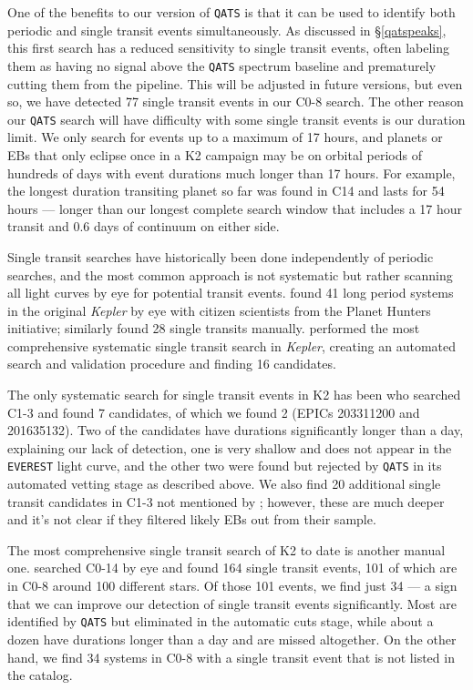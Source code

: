 \documentclass[twocolumn]{aastex62}
\newcommand{\project}[1]{\textsl{#1}}
\newcommand{\pipeline}[1]{\texttt{#1}}
\newcommand{\nsingletran}{77}
\begin{document}
One of the benefits to our version of \pipeline{QATS} is that it can
be used to identify both periodic and single transit events
simultaneously. As discussed in \S\ref{qatspeaks}, this first search
has a reduced sensitivity to single transit events, often labeling
them as having no signal above the \pipeline{QATS} spectrum baseline
and prematurely cutting them from the pipeline. This will be adjusted
in future versions, but even so, we have detected \nsingletran{}
single transit events in our C0-8 search. The other reason our
\pipeline{QATS} search will have difficulty with some single transit
events is our duration limit. We only search for events up to a
maximum of 17 hours, and planets or EBs that only eclipse once in a K2
campaign may be on orbital periods of hundreds of days with event
durations much longer than 17 hours. For example, the longest duration
transiting planet so far was found in C14 and lasts for 54 hours
\citep{gil18} --- longer than our longest complete search window that
includes a 17 hour transit and 0.6 days of continuum on either side.

Single transit searches have historically been done independently of
periodic searches, and the most common approach is not systematic but
rather scanning all light curves by eye for potential transit
events. \cite{wan15} found 41 long period systems in the original
\project{Kepler} by eye with citizen scientists from the Planet
Hunters initiative; \cite{ueh16} similarly found 28 single transits
manually.  \cite{for16} performed the most comprehensive systematic
single transit search in \project{Kepler}, creating an automated
search and validation procedure and finding 16 candidates.

The only systematic search for single transit events in K2 has been
\cite{osb16} who searched C1-3 and found 7 candidates, of which we
found 2 (EPICs 203311200 and 201635132). Two of the \cite{osb16}
candidates have durations significantly longer than a day, explaining
our lack of detection, one is very shallow and does not appear in the
\pipeline{EVEREST} light curve, and the other two were found but
rejected by \pipeline{QATS} in its automated vetting stage as
described above.  We also find 20 additional single transit candidates
in C1-3 not mentioned by \cite{osb16}; however, these are much deeper
and it's not clear if they filtered likely EBs out from their sample.

The most comprehensive single transit search of K2 to date is another
manual one. \cite{lac18} searched C0-14 by eye and found 164 single
transit events, 101 of which are in C0-8 around 100 different
stars. Of those 101 events, we find just 34 --- a sign that we can
improve our detection of single transit events significantly. Most are
identified by \pipeline{QATS} but eliminated in the automatic cuts
stage, while about a dozen have durations longer than a day and are
missed altogether. On the other hand, we find 34 systems in C0-8 with
a single transit event that is not listed in the \cite{lac18} catalog.
\end{document}
